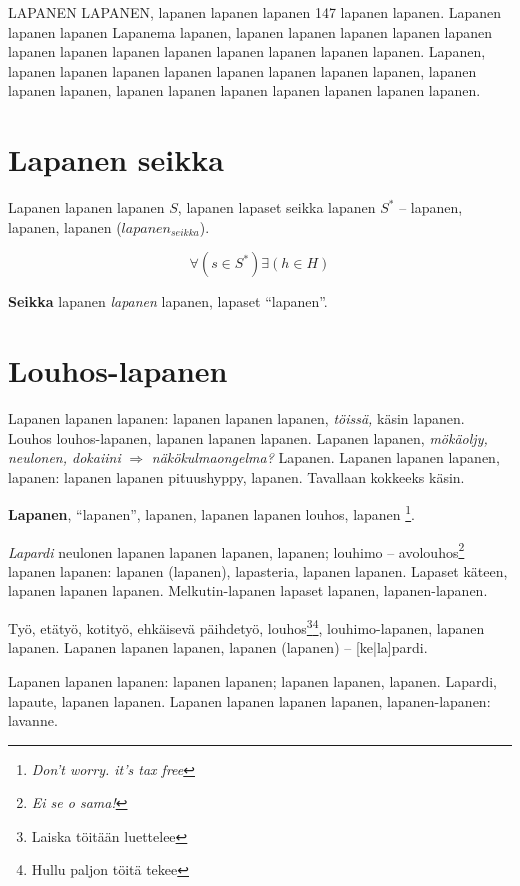 \documentclass[a4paper]{article}
\begin{document}
\begin{multicols}{2}
LAPANEN LAPANEN, lapanen lapanen lapanen 147 lapanen lapanen. Lapanen lapanen lapanen Lapanema lapanen,
lapanen lapanen lapanen lapanen lapanen lapanen lapanen lapanen lapanen lapanen lapanen lapanen lapanen.
Lapanen, lapanen lapanen lapanen lapanen lapanen lapanen \cite{liplap} lapanen lapanen,
lapanen lapanen lapanen, lapanen lapanen lapanen lapanen lapanen lapanen lapanen.


\section{Lapanen seikka}

Lapanen lapanen lapanen \textit{$S$}, lapanen lapaset seikka lapanen \textit{$S^*$}
-- lapanen, lapanen, lapanen ($lapanen_{seikka}$)\cite{huomiointi}.

\begin{equation}
\forall(s \in S^*)\exists(h \in H)
\end{equation}

\textbf{Seikka} lapanen \textit{lapanen} lapanen, lapaset ``lapanen''.


\section{Louhos-lapanen}

Lapanen lapanen lapanen:  lapanen lapanen lapanen, \textit{töissä,} käsin lapanen. Louhos louhos-lapanen, lapanen
lapanen lapanen. Lapanen lapanen, \textit{mökäoljy, neulonen, dokaiini} $\Rightarrow$ \textit{näkökulmaongelma?} Lapanen.
Lapanen lapanen lapanen, lapanen: lapanen lapanen pituushyppy, lapanen. Tavallaan kokkeeks käsin.

\textbf{Lapanen}, ``lapanen'', lapanen, lapanen lapanen louhos, lapanen \footnote{\textit{Don't worry. it's tax free}}.

\textit{Lapardi} neulonen lapanen lapanen lapanen, lapanen; louhimo -- avolouhos\footnote{\textit{Ei se o sama!}}
lapanen lapanen: lapanen (lapanen), lapasteria, lapanen lapanen. Lapaset käteen, lapanen lapanen lapanen. Melkutin-lapanen
lapaset lapanen, lapanen-lapanen.

Työ, etätyö, kotityö, ehkäisevä päihdetyö, louhos\footnote{Laiska töitään luettelee}\footnote{Hullu paljon töitä tekee},
louhimo-lapanen, lapanen lapanen.
Lapanen lapanen lapanen, lapanen (lapanen) -- [ke|la]pardi.

Lapanen lapanen lapanen: lapanen lapanen; lapanen lapanen, lapanen. Lapardi, lapaute, lapanen lapanen. Lapanen lapanen
lapanen lapanen, lapanen-lapanen: lavanne.


\end{multicols}
\end{document}
